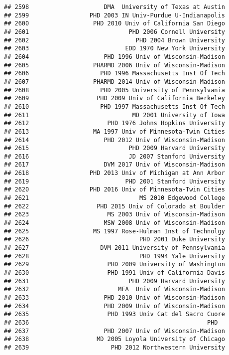 \documentclass[
]{article}
\begin{document}
\begin{verbatim}
## 2598                     DMA  University of Texas at Austin
## 2599                 PHD 2003 IN Univ-Purdue U-Indianapolis
## 2600                  PHD 2010 Univ of California San Diego
## 2601                            PHD 2006 Cornell University
## 2602                              PHD 2004 Brown University
## 2603                           EDD 1970 New York University
## 2604                     PHD 1996 Univ of Wisconsin-Madison
## 2605                  PHARMD 2006 Univ of Wisconsin-Madison
## 2606                    PHD 1996 Massachusetts Inst Of Tech
## 2607                  PHARMD 2014 Univ of Wisconsin-Madison
## 2608                    PHD 2005 University of Pennsylvania
## 2609                   PHD 2009 Univ of California Berkeley
## 2610                    PHD 1997 Massachusetts Inst Of Tech
## 2611                             MD 2001 University of Iowa
## 2612                      PHD 1976 Johns Hopkins University
## 2613                  MA 1997 Univ of Minnesota-Twin Cities
## 2614                     PHD 2012 Univ of Wisconsin-Madison
## 2615                            PHD 2009 Harvard University
## 2616                            JD 2007 Stanford University
## 2617                     DVM 2017 Univ of Wisconsin-Madison
## 2618                 PHD 2013 Univ of Michigan at Ann Arbor
## 2619                           PHD 2001 Stanford University
## 2620                 PHD 2016 Univ of Minnesota-Twin Cities
## 2621                               MS 2010 Edgewood College
## 2622                   PHD 2015 Univ of Colorado at Boulder
## 2623                      MS 2003 Univ of Wisconsin-Madison
## 2624                     MSW 2008 Univ of Wisconsin-Madison
## 2625                  MS 1997 Rose-Hulman Inst of Technolgy
## 2626                               PHD 2001 Duke University
## 2627                    DVM 2011 University of Pennsylvania
## 2628                               PHD 1994 Yale University
## 2629                      PHD 2009 University of Washington
## 2630                      PHD 1991 Univ of California Davis
## 2631                            PHD 2009 Harvard University
## 2632                         MFA  Univ of Wisconsin-Madison
## 2633                     PHD 2010 Univ of Wisconsin-Madison
## 2634                     PHD 2009 Univ of Wisconsin-Madison
## 2635                      PHD 1993 Univ Cat del Sacro Cuore
## 2636                                                  PHD  
## 2637                     PHD 2007 Univ of Wisconsin-Madison
## 2638                   MD 2005 Loyola University of Chicago
## 2639                       PHD 2012 Northwestern University

\end{verbatim}
\end{document}
